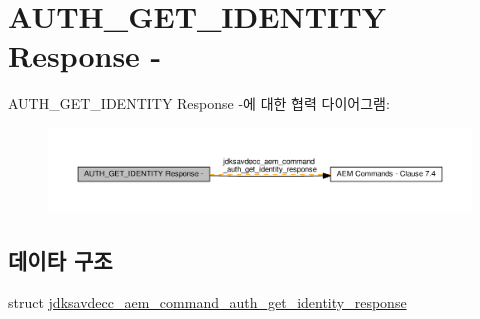 \hypertarget{group__command__auth__get__identity__response}{}\section{A\+U\+T\+H\+\_\+\+G\+E\+T\+\_\+\+I\+D\+E\+N\+T\+I\+TY Response -\/}
\label{group__command__auth__get__identity__response}
A\+U\+T\+H\+\_\+\+G\+E\+T\+\_\+\+I\+D\+E\+N\+T\+I\+TY Response -\/에 대한 협력 다이어그램\+:
\nopagebreak
\begin{figure}[H]
\begin{center}
\leavevmode
\includegraphics[width=350pt]{group__command__auth__get__identity__response}
\end{center}
\end{figure}
\subsection*{데이타 구조}
\begin{DoxyCompactItemize}
\item 
struct \hyperlink{structjdksavdecc__aem__command__auth__get__identity__response}{jdksavdecc\+\_\+aem\+\_\+command\+\_\+auth\+\_\+get\+\_\+identity\+\_\+response}
\end{DoxyCompactItemize}
